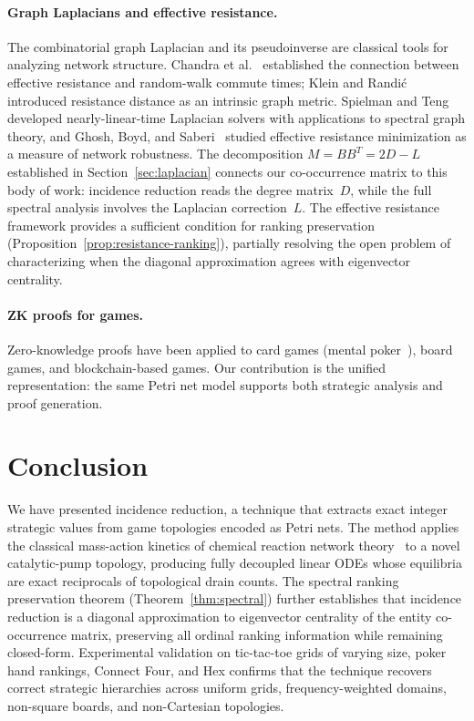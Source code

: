 \documentclass[11pt,a4paper]{article}
\begin{document}
\paragraph{Graph Laplacians and effective resistance.}
The combinatorial graph Laplacian and its pseudoinverse are classical tools for analyzing network structure.
Chandra et al.~\cite{chandra1989} established the connection between effective resistance and random-walk commute times; Klein and Randi\'{c}~\cite{klein1993} introduced resistance distance as an intrinsic graph metric.
Spielman and Teng~\cite{spielman2011} developed nearly-linear-time Laplacian solvers with applications to spectral graph theory, and Ghosh, Boyd, and Saberi~\cite{ghosh2008} studied effective resistance minimization as a measure of network robustness.
The decomposition $M = BB^T = 2D - L$ established in Section~\ref{sec:laplacian} connects our co-occurrence matrix to this body of work: incidence reduction reads the degree matrix~$D$, while the full spectral analysis involves the Laplacian correction~$L$.
The effective resistance framework provides a sufficient condition for ranking preservation (Proposition~\ref{prop:resistance-ranking}), partially resolving the open problem of characterizing when the diagonal approximation agrees with eigenvector centrality.

\paragraph{ZK proofs for games.}
Zero-knowledge proofs have been applied to card games (mental poker~\cite{shamir1981}), board games, and blockchain-based games.
Our contribution is the unified representation: the same Petri net model supports both strategic analysis and proof generation.

\section{Conclusion}
\label{sec:conclusion}

We have presented incidence reduction, a technique that extracts exact integer strategic values from game topologies encoded as Petri nets.
The method applies the classical mass-action kinetics of chemical reaction network theory~\cite{horn1972,feinberg2019} to a novel catalytic-pump topology, producing fully decoupled linear ODEs whose equilibria are exact reciprocals of topological drain counts.
The spectral ranking preservation theorem (Theorem~\ref{thm:spectral}) further establishes that incidence reduction is a diagonal approximation to eigenvector centrality of the entity co-occurrence matrix, preserving all ordinal ranking information while remaining closed-form.
Experimental validation on tic-tac-toe grids of varying size, poker hand rankings, Connect Four, and Hex confirms that the technique recovers correct strategic hierarchies across uniform grids, frequency-weighted domains, non-square boards, and non-Cartesian topologies.
\end{document}
